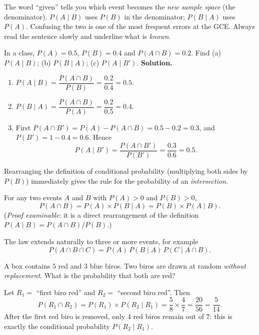 \documentclass[11pt]{article}
\newcounter{popsec}
\newcounter{popsub}
\newcommand{\courssub}[1]{%
  \stepcounter{popsub}%
  \par\vspace{9pt}\noindent{\popxbold\fontsize{11.5}{13}\selectfont\color{popink}{\color{poporange}\thepopsec.\thepopsub}\hspace{6pt}#1}\par\nopagebreak\vspace{4pt}
}
\begin{document}
\begin{attention}
The word ``given'' tells you which event becomes the \emph{new sample space} (the denominator). $P(A\mid B)$ uses $P(B)$ in the denominator; $P(B\mid A)$ uses $P(A)$. Confusing the two is one of the most frequent errors at the GCE. Always read the sentence slowly and underline what is \emph{known}.
\end{attention}

\begin{exoresolu}
In a class, $P(A)=0.5$, $P(B)=0.4$ and $P(A\cap B)=0.2$. Find (a) $P(A\mid B)$; (b) $P(B\mid A)$; (c) $P(A\mid B')$.
\tcblower
\textbf{Solution.}
\begin{enumerate}
\item $P(A\mid B)=\dfrac{P(A\cap B)}{P(B)}=\dfrac{0.2}{0.4}=0.5$.
\item $P(B\mid A)=\dfrac{P(A\cap B)}{P(A)}=\dfrac{0.2}{0.5}=0.4$.
\item First $P(A\cap B')=P(A)-P(A\cap B)=0.5-0.2=0.3$, and $P(B')=1-0.4=0.6$. Hence
\[
P(A\mid B')=\frac{P(A\cap B')}{P(B')}=\frac{0.3}{0.6}=0.5.
\]
\end{enumerate}
\end{exoresolu}

\courssub{The Multiplication Law}

Rearranging the definition of conditional probability (multiplying both sides by $P(B)$) immediately gives the rule for the probability of an \emph{intersection}.

\begin{propriete}
For any two events $A$ and $B$ with $P(A)>0$ and $P(B)>0$,
\[
P(A\cap B)=P(A)\times P(B\mid A)=P(B)\times P(A\mid B).
\]
(\emph{Proof examinable}: it is a direct rearrangement of the definition $P(A\mid B)=P(A\cap B)/P(B)$.)
\end{propriete}

The law extends naturally to three or more events, for example
\[
P(A\cap B\cap C)=P(A)\,P(B\mid A)\,P(C\mid A\cap B).
\]

\begin{exemplebox}
A box contains $5$ red and $3$ blue biros. Two biros are drawn at random \emph{without replacement}. What is the probability that both are red?

Let $R_1=$ ``first biro red'' and $R_2=$ ``second biro red''. Then
\[
P(R_1\cap R_2)=P(R_1)\times P(R_2\mid R_1)=\frac{5}{8}\times\frac{4}{7}=\frac{20}{56}=\frac{5}{14}.
\]
After the first red biro is removed, only $4$ red biros remain out of $7$: this is exactly the conditional probability $P(R_2\mid R_1)$.
\end{exemplebox}
\end{document}
